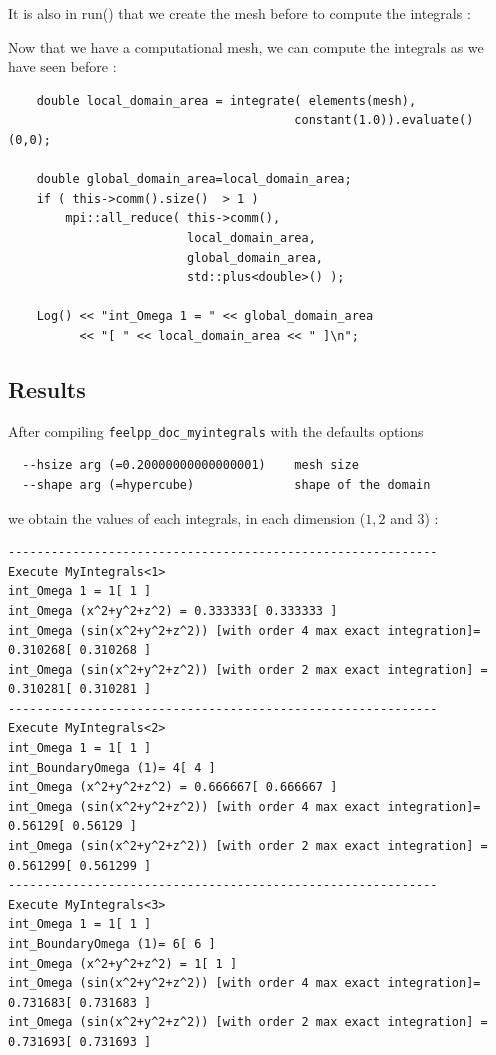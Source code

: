 It is also in run() that we create the mesh before to compute the integrals :

Now that we have a computational mesh, we can compute the integrals as we have seen before :

\begin{lstlisting}
    double local_domain_area = integrate( elements(mesh),
                                        constant(1.0)).evaluate()(0,0);

    double global_domain_area=local_domain_area;
    if ( this->comm().size()  > 1 )
        mpi::all_reduce( this->comm(),
                         local_domain_area,
                         global_domain_area,
                         std::plus<double>() );

    Log() << "int_Omega 1 = " << global_domain_area
          << "[ " << local_domain_area << " ]\n";
\end{lstlisting}

\subsection{Results}

After compiling \lstinline!feelpp_doc_myintegrals! with the defaults options
\begin{lstlisting}
  --hsize arg (=0.20000000000000001)    mesh size
  --shape arg (=hypercube)              shape of the domain
\end{lstlisting}

we obtain the values of each integrals, in each dimension ($1,2$ and $3$) : \\
\begin{lstlisting}
------------------------------------------------------------
Execute MyIntegrals<1>
int_Omega 1 = 1[ 1 ]
int_Omega (x^2+y^2+z^2) = 0.333333[ 0.333333 ]
int_Omega (sin(x^2+y^2+z^2)) [with order 4 max exact integration]= 0.310268[ 0.310268 ]
int_Omega (sin(x^2+y^2+z^2)) [with order 2 max exact integration] = 0.310281[ 0.310281 ]
------------------------------------------------------------
Execute MyIntegrals<2>
int_Omega 1 = 1[ 1 ]
int_BoundaryOmega (1)= 4[ 4 ]
int_Omega (x^2+y^2+z^2) = 0.666667[ 0.666667 ]
int_Omega (sin(x^2+y^2+z^2)) [with order 4 max exact integration]= 0.56129[ 0.56129 ]
int_Omega (sin(x^2+y^2+z^2)) [with order 2 max exact integration] = 0.561299[ 0.561299 ]
------------------------------------------------------------
Execute MyIntegrals<3>
int_Omega 1 = 1[ 1 ]
int_BoundaryOmega (1)= 6[ 6 ]
int_Omega (x^2+y^2+z^2) = 1[ 1 ]
int_Omega (sin(x^2+y^2+z^2)) [with order 4 max exact integration]= 0.731683[ 0.731683 ]
int_Omega (sin(x^2+y^2+z^2)) [with order 2 max exact integration] = 0.731693[ 0.731693 ]
\end{lstlisting}



